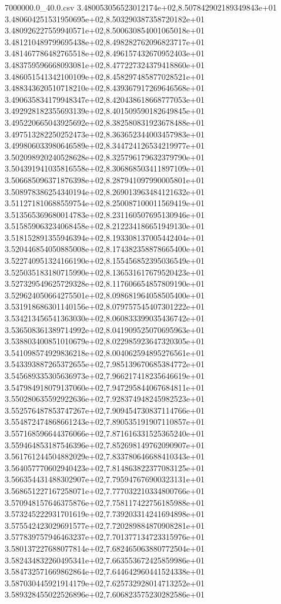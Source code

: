 \begin{filecontents*}{7000000.0_40.0.csv}
3.480053056523012174e+02,8.507842902189349843e+01
3.480604251531950695e+02,8.503290387358720182e+01
3.480926227559940571e+02,8.500630854001065018e+01
3.481210489799695438e+02,8.498282762096823717e+01
3.481467786482765518e+02,8.496157432670952403e+01
3.483759596668093081e+02,8.477227324379418860e+01
3.486051541342100109e+02,8.458297485877028521e+01
3.488343620510718210e+02,8.439367917269646568e+01
3.490635834179948347e+02,8.420438618668777053e+01
3.492928182355693139e+02,8.401509590182649845e+01
3.495220665043925692e+02,8.382580831923678488e+01
3.497513282250252473e+02,8.363652344003457983e+01
3.499806033980646589e+02,8.344724126534219977e+01
3.502098920240528628e+02,8.325796179632379790e+01
3.504391941035816558e+02,8.306868503411897109e+01
3.506685096371876398e+02,8.287941097990005801e+01
3.508978386254340194e+02,8.269013963484121632e+01
3.511271810688559754e+02,8.250087100011569419e+01
3.513565369680014783e+02,8.231160507695130946e+01
3.515859063234068458e+02,8.212234186651949130e+01
3.518152891355946394e+02,8.193308137005442404e+01
3.520446854050885008e+02,8.174382358878665400e+01
3.522740951324166190e+02,8.155456852395036549e+01
3.525035183180715990e+02,8.136531617679520423e+01
3.527329549625729328e+02,8.117606654857809190e+01
3.529624050664275501e+02,8.098681964058505400e+01
3.531918686301140156e+02,8.079757545407301222e+01
3.534213456541363030e+02,8.060833399035436742e+01
3.536508361389714992e+02,8.041909525070695963e+01
3.538803400851010679e+02,8.022985923647320305e+01
3.541098574929836218e+02,8.004062594895276561e+01
3.543393887265372655e+02,7.985139670685384772e+01
3.545689335305636973e+02,7.966217418235646619e+01
3.547984918079137060e+02,7.947295844067684811e+01
3.550280635592922636e+02,7.928374948245982523e+01
3.552576487853747267e+02,7.909454730837114766e+01
3.554872474868661243e+02,7.890535191907110857e+01
3.557168596644376066e+02,7.871616331525365240e+01
3.559464853187546396e+02,7.852698149762090907e+01
3.561761244504882029e+02,7.833780646688410343e+01
3.564057770602940423e+02,7.814863822377083125e+01
3.566354431488302907e+02,7.795947676900323131e+01
3.568651227167258071e+02,7.777032210334800766e+01
3.570948157646375876e+02,7.758117422756185988e+01
3.573245222931701619e+02,7.739203314241694898e+01
3.575542423029691577e+02,7.720289884870908281e+01
3.577839757946463237e+02,7.701377134723315976e+01
3.580137227688077814e+02,7.682465063880772504e+01
3.582434832260495341e+02,7.663553672425859986e+01
3.584732571669862864e+02,7.644642960441524338e+01
3.587030445921914179e+02,7.625732928014713252e+01
3.589328455022526896e+02,7.606823575230282586e+01

\end{filecontents*}
